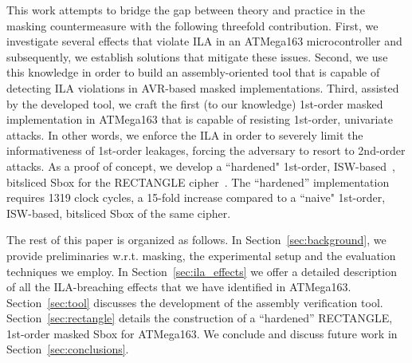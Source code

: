 This work attempts to bridge the gap between theory and practice in the masking countermeasure with the following threefold contribution. First, we investigate several effects that violate ILA in an ATMega163 microcontroller and subsequently, we establish solutions that mitigate these issues. Second, we use this knowledge in order to build an assembly-oriented tool that is capable of detecting ILA violations in AVR-based masked implementations. Third, assisted by the developed tool, we craft the first (to our knowledge) 1st-order masked implementation in ATMega163 that is capable of resisting 1st-order, univariate attacks. In other words, we enforce the ILA in order to severely limit the informativeness of 1st-order leakages, forcing the adversary to resort to 2nd-order attacks. As a proof of concept, we develop a ``hardened" 1st-order, ISW-based~\cite{DBLP:conf/crypto/IshaiSW03}, bitsliced Sbox for the RECTANGLE cipher~\cite{DBLP:journals/chinaf/ZhangBLR0V15}. The ``hardened'' implementation requires 1319 clock cycles, a 15-fold increase compared to a ``naive" 1st-order, ISW-based, bitsliced Sbox of the same cipher. 

The rest of this paper is organized as follows. In Section~\ref{sec:background}, we provide preliminaries w.r.t. masking, the experimental setup and the evaluation techniques we employ. In Section~\ref{sec:ila_effects} we offer a detailed description of all the ILA-breaching effects that we have identified in ATMega163. 
Section~\ref{sec:tool} discusses the development of the assembly verification tool. Section~\ref{sec:rectangle} details the construction of a ``hardened'' RECTANGLE, 1st-order masked Sbox for ATMega163. We conclude and discuss future work in Section~\ref{sec:conclusions}.


